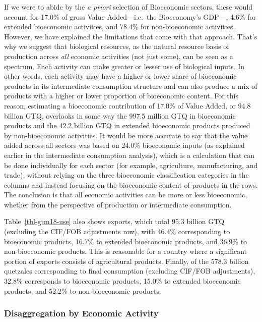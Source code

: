 \documentclass[
  letterpaper,
  DIV=11,
  numbers=noendperiod]{scrartcl}
\begin{document}
If we were to abide by the \emph{a priori} selection of Bioeconomic
sectors, these would account for 17.0\% of gross Value Added---i.e.~the
Bioeconomy's GDP---, 4.6\% for extended bioeconomic activities, and
78.4\% for non-bioeconomic activities. However, we have explained the
limitations that come with that approach. That's why we suggest that
biological resources, as the natural resource basis of production across
\emph{all} economic activities (not just some), can be seen as a
spectrum. Each activity can make greater or lesser use of biological
inputs. In other words, each activity may have a higher or lower share
of bioeconomic products in its intermediate consumption structure and
can also produce a mix of products with a higher or lower proportion of
bioeconomic content. For this reason, estimating a bioeconomic
contribution of 17.0\% of Value Added, or 94.8 billion GTQ, overlooks in
some way the 997.5 million GTQ in bioeconomic products and the 42.2
billion GTQ in extended bioeconomic products produced by non-bioeconomic
activities. It would be more accurate to say that the value added across
all sectors was based on 24.0\% bioeconomic inputs (as explained earlier
in the intermediate consumption analysis), which is a calculation that
can be done individually for each sector (for example, agriculture,
manufacturing, and trade), without relying on the three bioeconomic
classification categories in the columns and instead focusing on the
bioeconomic content of products in the rows. The conclusion is that all
economic activities can be more or less bioeconomic, whether from the
perspective of production or intermediate consumption.

Table~\ref{tbl-gtm18-use} also shows exports, which total 95.3 billion
GTQ (excluding the CIF/FOB adjustments row), with 46.4\% corresponding
to bioeconomic products, 16.7\% to extended bioeconomic products, and
36.9\% to non-bioeconomic products. This is reasonable for a country
where a significant portion of exports consists of agricultural
products. Finally, of the 578.3 billion quetzales corresponding to final
consumption (excluding CIF/FOB adjustments), 32.8\% corresponds to
bioeconomic products, 15.0\% to extended bioeconomic products, and
52.2\% to non-bioeconomic products.

\subsubsection{Disaggregation by Economic
Activity}\label{disaggregation-by-economic-activity}
\end{document}
